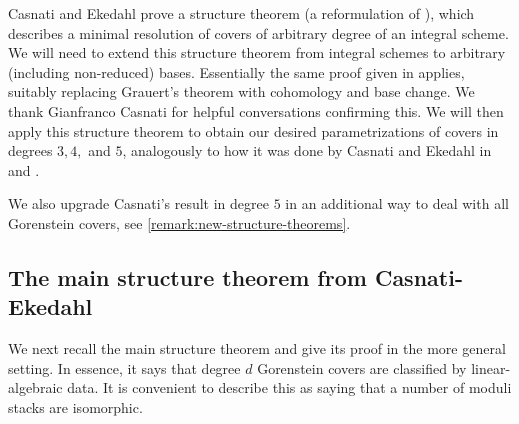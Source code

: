 \documentclass[12 pt]{amsart}
\theoremstyle{plain}
\theoremstyle{definition}
\theoremstyle{remark}
\numberwithin{equation}{section}
\begin{document}
Casnati and Ekedahl \cite{casnatiE:covers-algebraic-varieties} 
prove a structure theorem \cite[Thm.\
2.1]{casnatiE:covers-algebraic-varieties} (a reformulation of \cite[Thm.\
1.3]{casnatiE:covers-algebraic-varieties}),
which describes a minimal resolution of covers of arbitrary degree of an integral scheme.
We will need to extend this
structure theorem   from integral  schemes
to arbitrary (including non-reduced) bases.  Essentially the same proof given in \cite[Thm.\
2.1]{casnatiE:covers-algebraic-varieties} applies, suitably replacing  Grauert's theorem with cohomology and base
change.  We thank Gianfranco Casnati for helpful conversations confirming this.  
We  will then apply this structure theorem to obtain our desired parametrizations of covers in degrees $3,4,$ and $5$, analogously to how it was done by Casnati and Ekedahl in  \cite[Thm.\
3.4, Thm.\ 4.4]{casnatiE:covers-algebraic-varieties} and \cite[Thm.\
3.8]{casnati:covers-algebraic-varieties-ii}.

We also upgrade Casnati's result in degree $5$ in an additional way to deal with all
Gorenstein covers, see \autoref{remark:new-structure-theorems}.

\subsection{The main structure theorem from Casnati-Ekedahl}
\label{subsection:ce-main}

We next recall the main structure theorem and give its proof in the more general
setting.  In essence, it says that degree $d$ Gorenstein covers are
classified by linear-algebraic data.  It is convenient to describe
this as saying that a number of moduli stacks are isomorphic.
\end{document}
